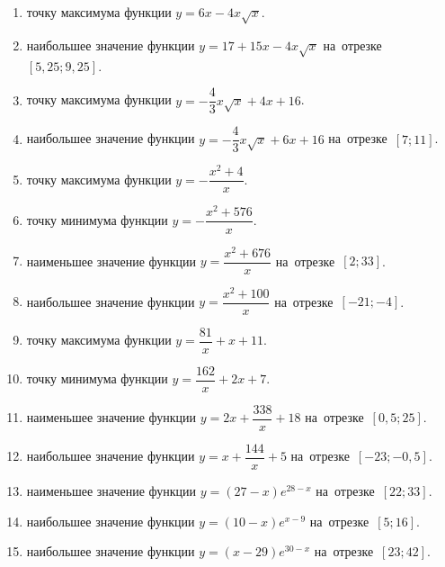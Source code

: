 \documentclass[a4paper,10pt]{article}
\begin{document}
\begin{enumerate}
\item {} точку максимума функции $y=6x -4x\sqrt{x}$.

\item {} наибольшее значение функции $y=17+15x -4x\sqrt{x}$ на~отрезке~$\left[5,25;9,25\right]$.

\item {} точку максимума функции $y=-\dfrac{4}{3}x\sqrt{x} +4x+16$.

\item {} наибольшее значение функции $y=-\dfrac{4}{3}x\sqrt{x} +6x+16$ на~отрезке~$\left[7;11\right]$.

\item {} точку максимума функции $y=-\dfrac{x^2 +4}{x}$.

\item {} точку минимума функции $y=-\dfrac{x^2 +576}{x}$.

\item {} наименьшее значение функции $y=\dfrac{x^2 +676}{x}$ на~отрезке~$\left[2;33\right]$.

\item {} наибольшее значение функции $y=\dfrac{x^2 +100}{x}$ на~отрезке~$\left[-21;-4\right]$.

\item {} точку максимума функции $y=\dfrac{81}{x} +x+11$.

\item {} точку минимума функции $y=\dfrac{162}{x} +2x+7$.

\item {} наименьшее значение функции $y=2x+\dfrac{338}{x} +18$ на~отрезке~$\left[0,5;25\right]$.

\item {} наибольшее значение функции $y=x+\dfrac{144}{x} +5$ на~отрезке~$\left[-23;-0,5\right]$.

\item {} наименьшее значение функции $y=\left(27-x\right)e^{28-x}$ на~отрезке~$\left[22;33\right]$.

\item {} наибольшее значение функции $y=\left(10-x\right)e^{x-9}$ на~отрезке~$\left[5;16\right]$.

\item {} наибольшее значение функции $y=\left(x-29\right)e^{30-x}$ на~отрезке~$\left[23;42\right]$.


\end{enumerate}
\end{document}
